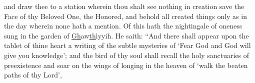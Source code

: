 \documentclass[12pt]{article}
\begin{document}
\vspace{2ex}
 {
and draw thee to a station wherein thou shalt see nothing in creation save the Face of thy Beloved One, the Honored,
}
\vspace{2ex}
 {
and behold all created things only as in the day wherein none hath a mention.
}
\vspace{2ex}
 {
Of this hath the nightingale of oneness sung in the garden of \underline{Gh}aw\underline{th}\'{\i}yyih.\footnotemark[4]
}
\vspace{2ex}
 {
He saith: ``And there shall appear upon the tablet of thine heart
}
\vspace{2ex}
 {
a writing of the subtle mysteries of `Fear God and God will give you knowledge';\footnotemark[5]
}
\vspace{2ex}
 {
and the bird of thy soul shall recall the holy sanctuaries of preexistence
}
\vspace{2ex}
 {
and soar on the wings of longing in the heaven of `walk the beaten paths of thy Lord',\footnotemark[6]
}
\end{document}
